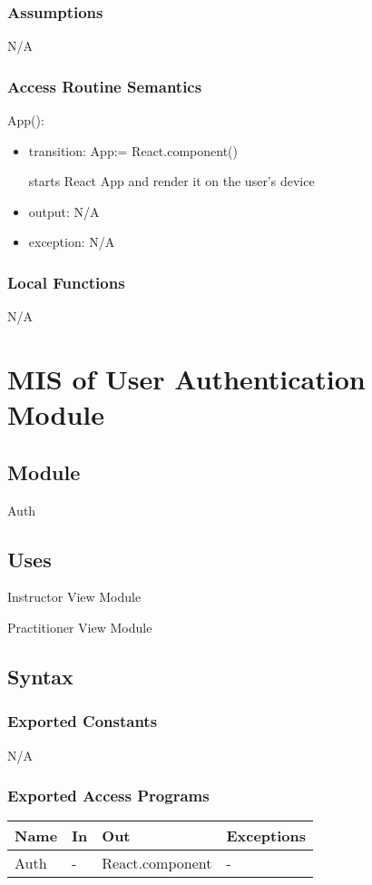 \documentclass[12pt, titlepage]{article}
\begin{document}
\subsubsection{Assumptions}
N/A

\subsubsection{Access Routine Semantics}

\noindent App():
\begin{itemize}
\item transition: App:= React.component()

  starts React App and render it on the user's device
\item output: N/A
\item exception: N/A
\end{itemize}

\subsubsection{Local Functions}
N/A

\section{MIS of User Authentication Module} \label{sec:userauth}

\subsection{Module}
Auth

\subsection{Uses}
Instructor View Module

Practitioner View Module

\subsection{Syntax}

\subsubsection{Exported Constants}
N/A

\subsubsection{Exported Access Programs}
\begin{table}[h!]
  \centering
  \begin{tabular}{llll}
    \hline
    \textbf{Name} & \textbf{In} & \textbf{Out}          & \textbf{Exceptions} \\
    \hline
    Auth    & -     & React.component & -             \\
    \hline
  \end{tabular}
\end{table}
\end{document}
